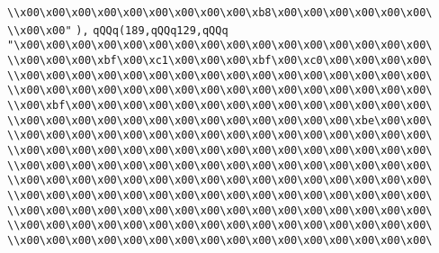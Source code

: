 \verb|\\x00\x00\x00\x00\x00\x00\x00\x00\x00\xb8\x00\x00\x00\x00\x00\x00\|\newline
\verb|\\x00\x00"|\newline
\verb|),|\newline
\verb|qQQq(189,qQQq129,qQQq|\newline
\verb|"\x00\x00\x00\x00\x00\x00\x00\x00\x00\x00\x00\x00\x00\x00\x00\x00\|\newline
\verb|\\x00\x00\x00\xbf\x00\xc1\x00\x00\x00\xbf\x00\xc0\x00\x00\x00\x00\|\newline
\verb|\\x00\x00\x00\x00\x00\x00\x00\x00\x00\x00\x00\x00\x00\x00\x00\x00\|\newline
\verb|\\x00\x00\x00\x00\x00\x00\x00\x00\x00\x00\x00\x00\x00\x00\x00\x00\|\newline
\verb|\\x00\xbf\x00\x00\x00\x00\x00\x00\x00\x00\x00\x00\x00\x00\x00\x00\|\newline
\verb|\\x00\x00\x00\x00\x00\x00\x00\x00\x00\x00\x00\x00\x00\xbe\x00\x00\|\newline
\verb|\\x00\x00\x00\x00\x00\x00\x00\x00\x00\x00\x00\x00\x00\x00\x00\x00\|\newline
\verb|\\x00\x00\x00\x00\x00\x00\x00\x00\x00\x00\x00\x00\x00\x00\x00\x00\|\newline
\verb|\\x00\x00\x00\x00\x00\x00\x00\x00\x00\x00\x00\x00\x00\x00\x00\x00\|\newline
\verb|\\x00\x00\x00\x00\x00\x00\x00\x00\x00\x00\x00\x00\x00\x00\x00\x00\|\newline
\verb|\\x00\x00\x00\x00\x00\x00\x00\x00\x00\x00\x00\x00\x00\x00\x00\x00\|\newline
\verb|\\x00\x00\x00\x00\x00\x00\x00\x00\x00\x00\x00\x00\x00\x00\x00\x00\|\newline
\verb|\\x00\x00\x00\x00\x00\x00\x00\x00\x00\x00\x00\x00\x00\x00\x00\x00\|\newline
\verb|\\x00\x00\x00\x00\x00\x00\x00\x00\x00\x00\x00\x00\x00\x00\x00\x00\|\newline
